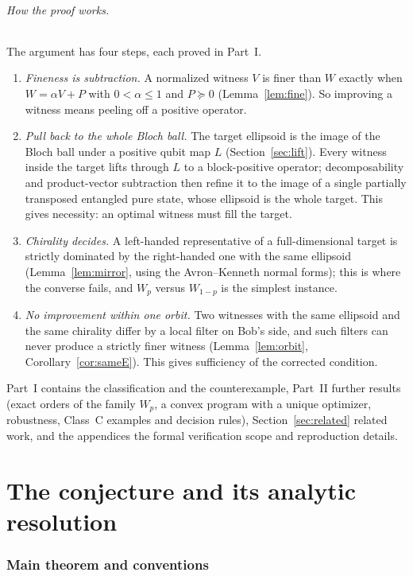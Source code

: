 \documentclass[11pt,a4paper]{article}
\theoremstyle{definition}\newtheorem{definition}[theorem]{Definition}
\theoremstyle{plain}\newtheorem*{theorem*}{Theorem}
\begin{document}
\paragraph{How the proof works.} The argument has four steps, each proved in Part~I.
\begin{enumerate}[label=\arabic*.]
\item \emph{Fineness is subtraction.} A normalized witness $V$ is finer than $W$ exactly when $W=\alpha V+P$ with $0<\alpha\le1$ and $P\succeq0$ (Lemma~\ref{lem:fine}). So improving a witness means peeling off a positive operator.
\item \emph{Pull back to the whole Bloch ball.} The target ellipsoid is the image of the Bloch ball under a positive qubit map $L$ (Section~\ref{sec:lift}). Every witness inside the target lifts through $L$ to a block-positive operator; decomposability and product-vector subtraction then refine it to the image of a single partially transposed entangled pure state, whose ellipsoid is the whole target. This gives necessity: an optimal witness must fill the target.
\item \emph{Chirality decides.} A left-handed representative of a full-dimensional target is strictly dominated by the right-handed one with the same ellipsoid (Lemma~\ref{lem:mirror}, using the Avron--Kenneth normal forms); this is where the converse fails, and $W_p$ versus $W_{1-p}$ is the simplest instance.
\item \emph{No improvement within one orbit.} Two witnesses with the same ellipsoid and the same chirality differ by a local filter on Bob's side, and such filters can never produce a strictly finer witness (Lemma~\ref{lem:orbit}, Corollary~\ref{cor:sameE}). This gives sufficiency of the corrected condition.
\end{enumerate}
Part~I contains the classification and the counterexample, Part~II further results (exact orders of the family $W_p$, a convex program with a unique optimizer, robustness, Class~C examples and decision rules), Section~\ref{sec:related} related work, and the appendices the formal verification scope and reproduction details.

\part{The conjecture and its analytic resolution}

\section{Main theorem and conventions}
\end{document}
